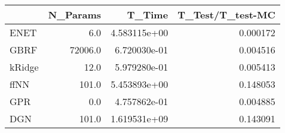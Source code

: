 \begin{tabular}{lrrr}
\toprule
{} &  N\_Params &        T\_Time &  T\_Test/T\_test-MC \\
\midrule
ENET   &       6.0 &  4.583115e+00 &          0.000172 \\
GBRF   &   72006.0 &  6.720030e-01 &          0.004516 \\
kRidge &      12.0 &  5.979280e-01 &          0.005413 \\
ffNN   &     101.0 &  5.453893e+00 &          0.148053 \\
GPR    &       0.0 &  4.757862e-01 &          0.004885 \\
DGN    &     101.0 &  1.619531e+09 &          0.143091 \\
\bottomrule
\end{tabular}
